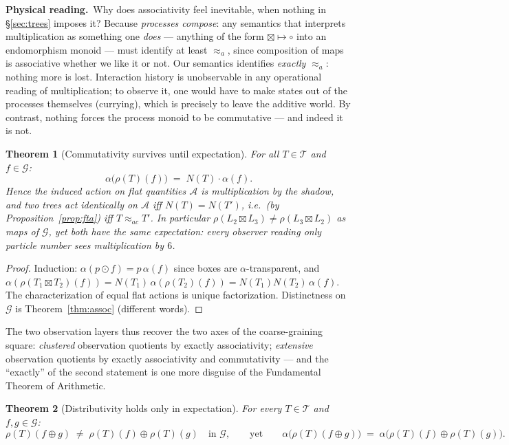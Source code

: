 \documentclass[11pt]{article}
\newcommand{\cT}{\mathcal{T}}   %
\newcommand{\cG}{\mathcal{G}}   %
\newcommand{\cA}{\mathcal{A}}   %
\newcommand{\act}{\rho}
\newcommand{\physread}{\medskip\noindent\textbf{Physical reading.}\ }
\numberwithin{equation}{section}
\theoremstyle{plain}
\newtheorem{theorem}{Theorem}[section]
\theoremstyle{definition}
\theoremstyle{remark}
\begin{document}
\physread Why does associativity feel inevitable, when nothing in \S\ref{sec:trees}
imposes it? Because \emph{processes compose}: any semantics that interprets
multiplication as something one \emph{does} --- anything of the form
$\boxtimes \mapsto \circ$ into an endomorphism monoid --- must identify at least
$\approx_a$, since composition of maps is associative whether we like it or not. Our
semantics identifies \emph{exactly} $\approx_a$: nothing more is lost. Interaction
history is unobservable in any operational reading of multiplication; to observe it,
one would have to make states out of the processes themselves (currying), which is
precisely to leave the additive world. By contrast, nothing forces the process monoid
to be commutative --- and indeed it is not.

\begin{theorem}[Commutativity survives until expectation]\label{thm:shadowaction}
For all $T \in \cT$ and $f \in \cG$:
\[
\alpha\bigl(\act(T)(f)\bigr) \;=\; N(T)\cdot \alpha(f).
\]
Hence the induced action on flat quantities $\cA$ is multiplication by the shadow, and
two trees act identically on $\cA$ iff $N(T) = N(T')$, i.e.\ (by
Proposition~\ref{prop:fta}) iff $T \approx_{ac} T'$. In particular
$\act(L_2 \boxtimes L_3) \ne \act(L_3 \boxtimes L_2)$ as maps of $\cG$, yet both have
the same expectation: every observer reading only particle number sees
multiplication by $6$.
\end{theorem}

\begin{proof}
Induction: $\alpha(p \odot f) = p\,\alpha(f)$ since boxes are $\alpha$-transparent,
and $\alpha(\act(T_1\boxtimes T_2)(f)) = N(T_1)\,\alpha(\act(T_2)(f)) =
N(T_1)N(T_2)\,\alpha(f)$. The characterization of equal flat actions is unique
factorization. Distinctness on $\cG$ is Theorem~\ref{thm:assoc} (different words).
\end{proof}

The two observation layers thus recover the two axes of the coarse-graining square:
\emph{clustered} observation quotients by exactly associativity; \emph{extensive}
observation quotients by exactly associativity and commutativity --- and the
``exactly'' of the second statement is one more disguise of the Fundamental Theorem
of Arithmetic.

\begin{theorem}[Distributivity holds only in expectation]\label{thm:distrib}
For every $T \in \cT$ and $f, g \in \cG$:
\[
\act(T)(f \oplus g) \;\neq\; \act(T)(f) \oplus \act(T)(g)
\quad\text{in } \cG,
\qquad\text{yet}\qquad
\alpha\bigl(\act(T)(f \oplus g)\bigr) \;=\;
\alpha\bigl(\act(T)(f) \oplus \act(T)(g)\bigr).
\]
\end{theorem}
\end{document}
